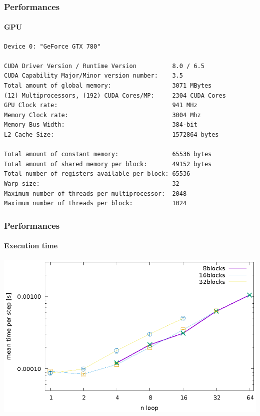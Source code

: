 \begin{frame}[fragile]
\frametitle{Performances}
\framesubtitle{GPU}
\begin{lstlisting}
Device 0: "GeForce GTX 780"

CUDA Driver Version / Runtime Version          8.0 / 6.5
CUDA Capability Major/Minor version number:    3.5
Total amount of global memory:                 3071 MBytes
(12) Multiprocessors, (192) CUDA Cores/MP:     2304 CUDA Cores
GPU Clock rate:                                941 MHz
Memory Clock rate:                             3004 Mhz
Memory Bus Width:                              384-bit
L2 Cache Size:                                 1572864 bytes

Total amount of constant memory:               65536 bytes
Total amount of shared memory per block:       49152 bytes
Total number of registers available per block: 65536
Warp size:                                     32
Maximum number of threads per multiprocessor:  2048
Maximum number of threads per block:           1024
\end{lstlisting}
\begin{center}

\end{center}
\end{frame}

\begin{frame}
\frametitle{Performances}
\framesubtitle{Execution time}
\begin{center}
\includegraphics[width = \textwidth]{../check/time/speed.eps}
\end{center}
\end{frame}

